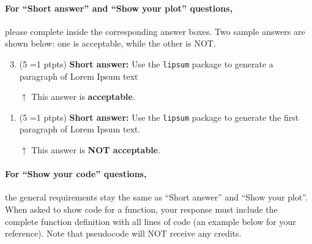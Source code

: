 \documentclass[11pt, letter, answers]{exam}
\newcommand{\pt}[1]{
    \small{(#1 \ifnum#1=1 pt\else pts\fi)}
    \normalsize
}
\newcommand{\sAll}{\textbf{Select all that apply: }}
\newcommand{\saq}{\textbf{Short answer: }}
\begin{document}


\newpage
\paragraph{For ``Short answer'' and ``Show your plot'' questions,} please complete inside the corresponding answer boxes. Two sample answers are shown below: one is acceptable, while the other is NOT.

\begin{enumerate}
\setcounter{enumi}{2}
\item \pt{5} \saq Use the \texttt{lipsum} package to generate a paragraph of Lorem Ipsum text

\begin{answerBox}[height=1.2in]
\lipsum[4]
\end{answerBox}

$\uparrow$ This answer is \textbf{acceptable}.
\end{enumerate}


\begin{enumerate}[label={}]
\item \pt{5} \saq Use the \texttt{lipsum} package to generate the first paragraph of Lorem Ipsum text.

\begin{tcolorbox}[height=1.2in, colback=white, sidebyside align=top, box align=top]
\lipsum[3]
\end{tcolorbox}

\vspace{2.5em}
{\color{red}$\uparrow$ This answer is \textbf{NOT acceptable}.}
\end{enumerate}


\paragraph{For ``Show your code'' questions,} the general requirements stay the same as ``Short answer'' and ``Show your plot''. When asked to show code for a function, your response must include the complete function definition with all lines of code (an example below for your reference). Note that pseudocode will NOT receive any credits.
\end{document}
